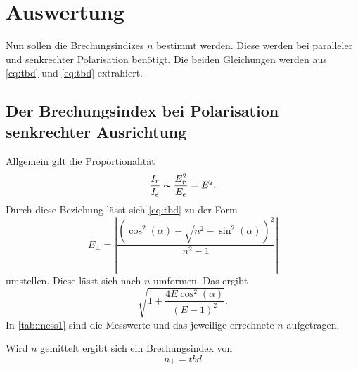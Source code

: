 \section{Auswertung}
\label{sec:Auswertung}

Nun sollen die Brechungsindizes $n$ bestimmt werden.
Diese werden bei paralleler und senkrechter Polarisation benötigt.
Die beiden Gleichungen werden aus \autoref{eq:tbd} und \autoref{eq:tbd} extrahiert.


\subsection{Der Brechungsindex bei Polarisation senkrechter Ausrichtung}

Allgemein gilt die Proportionalität 
\begin{equation}
  \frac{I_r}{I_e} \thicksim \frac{E_r^2}{E_e} = E^2.
\end{equation}
Durch diese Beziehung lässt sich \autoref{eq:tbd} zu der Form
\begin{equation*}
  E_{\perp}=\left|\frac{\left(\cos ^{2}(\alpha) - \sqrt{n^{2}-\sin ^{2}(\alpha)} \right)^{2}}{n^{2}-1}\right|
\end{equation*}
umstellen.
Diese lässt sich nach $n$ umformen.
Das ergibt
\begin{equation}
  \sqrt{1 + \frac{4 E \cos ^2(\alpha)}{(E - 1)^2}}.
\end{equation}
In \autoref{tab:mess1} sind die Messwerte und das jeweilige errechnete $n$ aufgetragen.

Wird $n$ gemittelt ergibt sich ein Brechungsindex von 
\begin{equation*}
  n_{\perp} = tbd
\end{equation*}



